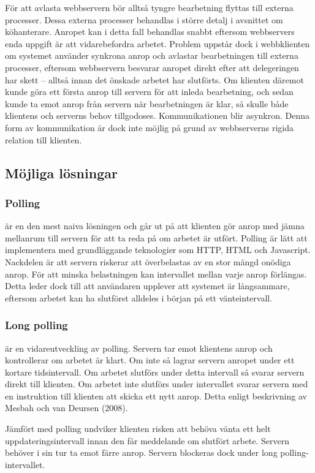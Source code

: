 För att avlasta webbservern bör alltså tyngre bearbetning flyttas till externa processer. Dessa externa processer behandlas i större detalj i avsnittet om köhanterare.
Anropet kan i detta fall behandlas snabbt eftersom webbservers enda uppgift är att vidarebefordra arbetet. Problem uppstår dock i webbklienten om systemet använder synkrona anrop och avlastar bearbetningen till externa processer, eftersom webbservern besvarar anropet direkt efter att delegeringen har skett – alltså innan det önskade arbetet har slutförts.
Om klienten däremot kunde göra ett första anrop till servern för att inleda bearbetning, och sedan kunde ta emot anrop från servern när bearbetningen är klar, så skulle både klientens och serverns behov tillgodoses. Kommunikationen blir asynkron. Denna form av kommunikation är dock inte möjlig på grund av webbserverns rigida relation till klienten.


\subsection{Möjliga lösningar}

\subsubsection{Polling} är en den mest naiva lösningen och går ut på att klienten gör anrop med jämna mellanrum till servern för att ta reda på om arbetet är utfört. Polling är lätt att implementera med grundläggande teknologier som HTTP, HTML och Javascript. Nackdelen är att servern riskerar att överbelastas av en stor mängd onödiga anrop. För att minska belastningen kan intervallet mellan varje anrop förlängas. Detta leder dock till att användaren upplever att systemet är långsammare, eftersom arbetet kan ha slutförst alldeles i början på ett vänteintervall.

\subsubsection{Long polling} är en vidareutveckling av polling. Servern tar emot klientens anrop och kontrollerar om arbetet är klart. Om inte så lagrar servern anropet under ett kortare tidsintervall. Om arbetet slutförs under detta intervall så svarar servern direkt till klienten. Om arbetet inte slutförs under intervallet svarar servern med en instruktion till klienten att skicka ett nytt anrop. Detta enligt beskrivning av Mesbah och van Deursen (2008). 

Jämfört med polling undviker klienten risken att behöva vänta ett helt uppdateringsintervall innan den får meddelande om slutfört arbete. Servern behöver i sin tur ta emot färre anrop. Servern blockeras dock under long polling-intervallet.

